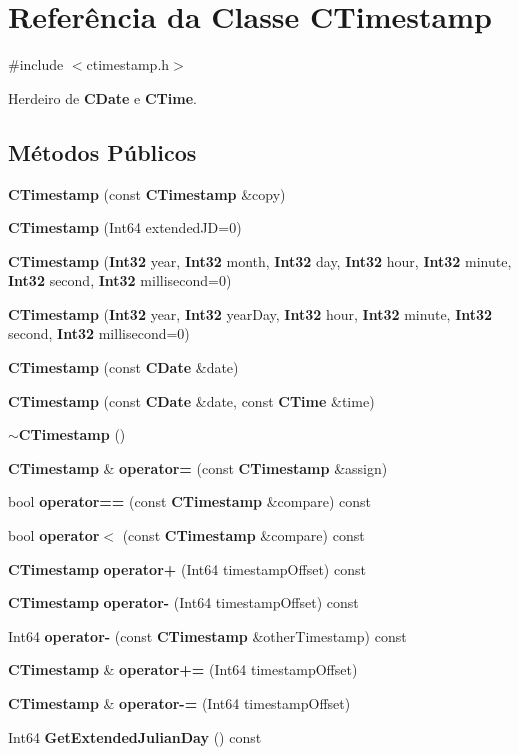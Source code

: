\section{Referência da Classe C\+Timestamp}
\label{class_c_timestamp}


{\ttfamily \#include $<$ctimestamp.\+h$>$}



Herdeiro de {\bf C\+Date} e {\bf C\+Time}.

\subsection*{Métodos Públicos}
\begin{DoxyCompactItemize}
\item 
{\bf C\+Timestamp} (const {\bf C\+Timestamp} \&copy)
\item 
{\bf C\+Timestamp} (Int64 extended\+JD=0)
\item 
{\bf C\+Timestamp} ({\bf Int32} year, {\bf Int32} month, {\bf Int32} day, {\bf Int32} hour, {\bf Int32} minute, {\bf Int32} second, {\bf Int32} millisecond=0)
\item 
{\bf C\+Timestamp} ({\bf Int32} year, {\bf Int32} year\+Day, {\bf Int32} hour, {\bf Int32} minute, {\bf Int32} second, {\bf Int32} millisecond=0)
\item 
{\bf C\+Timestamp} (const {\bf C\+Date} \&date)
\item 
{\bf C\+Timestamp} (const {\bf C\+Date} \&date, const {\bf C\+Time} \&time)
\item 
{\bf $\sim$\+C\+Timestamp} ()
\item 
{\bf C\+Timestamp} \& {\bf operator=} (const {\bf C\+Timestamp} \&assign)
\item 
bool {\bf operator==} (const {\bf C\+Timestamp} \&compare) const 
\item 
bool {\bf operator$<$} (const {\bf C\+Timestamp} \&compare) const 
\item 
{\bf C\+Timestamp} {\bf operator+} (Int64 timestamp\+Offset) const 
\item 
{\bf C\+Timestamp} {\bf operator-\/} (Int64 timestamp\+Offset) const 
\item 
Int64 {\bf operator-\/} (const {\bf C\+Timestamp} \&other\+Timestamp) const 
\item 
{\bf C\+Timestamp} \& {\bf operator+=} (Int64 timestamp\+Offset)
\item 
{\bf C\+Timestamp} \& {\bf operator-\/=} (Int64 timestamp\+Offset)
\item 
Int64 {\bf Get\+Extended\+Julian\+Day} () const 
\end{DoxyCompactItemize}
